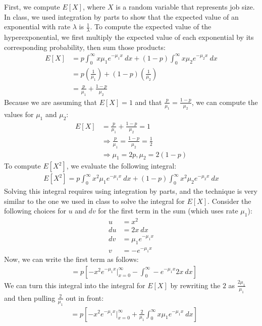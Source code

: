 \documentclass[12pt]{article}
\begin{document}
First, we compute $E[X]$, where $X$ is a random variable that represents job size. In class, we used integration by parts to show that the expected value of an exponential with rate $\lambda$ is $\frac{1}{\lambda}$. To compute the expected value of the hyperexponential, we first multiply the expected value of each exponential by its corresponding probability, then sum those products: 
\begin{align*} 
E[X] &= p \int_{0}^{\infty} x \mu_1 e^{-\mu_1 x} ~ dx + (1-p) \int_{0}^{\infty} x \mu_2 e^{-\mu_2 x} ~ dx \\
&= p(\frac{1}{\mu_1}) + (1-p)(\frac{1}{\mu_2}) \\
&= \frac{p}{\mu_1} + \frac{1-p}{\mu_2}
\end{align*}
Because we are assuming that $E[X] = 1$ and that $\frac{p}{\mu_1} = \frac{1-p}{\mu_2}$, we can compute the values for $\mu_1$ and $\mu_2$: 
\begin{align*}
E[X] &= \frac{p}{\mu_1} + \frac{1-p}{\mu_2} = 1 \\
&\Rightarrow
\frac{p}{\mu_1} = \frac{1-p}{\mu_2} = \frac{1}{2} \\
&\Rightarrow
\mu_1 = 2p, \mu_2 = 2(1-p)
\end{align*}
To compute $E[X^2]$, we evaluate the following integral: 
\begin{align*} 
E[X^2] = p \int_{0}^{\infty} x^2 \mu_1 e^{-\mu_1 x} ~ dx + (1-p) \int_{0}^{\infty} x^2 \mu_2 e^{-\mu_2 x} ~ dx
\end{align*}
Solving this integral requires using integration by parts, and the technique is very similar to the one we used in class to solve the integral for $E[X]$. Consider the following choices for $u$ and $dv$ for the first term in the sum (which uses rate $\mu_1$):
\begin{align*}
u &= x^2 \\
du &= 2x \: dx \\ 
dv &= \mu_1e^{-\mu_1 x} \\
v &= -e^{-\mu_1 x}
\end{align*}
Now, we can write the first term as follows:
\begin{align*}
&= p[-x^2e^{-\mu_1 x} \biggr\rvert_{x = 0}^{\infty} - \int_{0}^{\infty} -e^{-\mu_1 x} 2x ~ dx]
\end{align*}
We can turn this integral into the integral for $E[X]$ by rewriting the $2$ as $\frac{2\mu_1}{\mu_1}$ and then pulling $\frac{2}{\mu_1}$ out in front:
\begin{align*}
&= p[-x^2e^{-\mu_1 x} \biggr\rvert_{x = 0}^{\infty} + \frac{2}{\mu_1} \int_{0}^{\infty} x \mu_1 e^{-\mu_1 x} ~ dx]
\end{align*}
\end{document}
